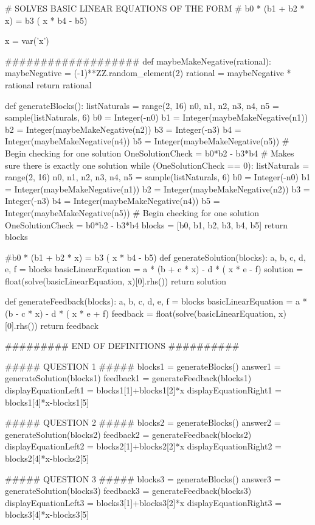 \documentclass{ximera}
\begin{document}
\begin{sagesilent}
# SOLVES BASIC LINEAR EQUATIONS OF THE FORM
    # b0 * (b1 + b2 * x) = b3 ( x * b4 - b5)

x = var('x')

###################
def maybeMakeNegative(rational):
    maybeNegative = (-1)**ZZ.random_element(2)
    rational = maybeNegative * rational
    return rational

def generateBlocks():
    listNaturals = range(2, 16)
    n0, n1, n2, n3, n4, n5 = sample(listNaturals, 6)
    b0 = Integer(-n0)
    b1 = Integer(maybeMakeNegative(n1))
    b2 = Integer(maybeMakeNegative(n2))
    b3 = Integer(-n3)
    b4 = Integer(maybeMakeNegative(n4))
    b5 = Integer(maybeMakeNegative(n5))
    # Begin checking for one solution
    OneSolutionCheck = b0*b2 - b3*b4
    # Makes sure there is exactly one solution
    while (OneSolutionCheck == 0):
        listNaturals = range(2, 16)
        n0, n1, n2, n3, n4, n5 = sample(listNaturals, 6)
        b0 = Integer(-n0)
        b1 = Integer(maybeMakeNegative(n1))
        b2 = Integer(maybeMakeNegative(n2))
        b3 = Integer(-n3)
        b4 = Integer(maybeMakeNegative(n4))
        b5 = Integer(maybeMakeNegative(n5))
        # Begin checking for one solution
        OneSolutionCheck = b0*b2 - b3*b4
    blocks = [b0, b1, b2, b3, b4, b5]
    return blocks

#b0 * (b1 + b2 * x) =  b3 ( x * b4 - b5)
def generateSolution(blocks):
    a, b, c, d, e, f = blocks
    basicLinearEquation = a * (b + c * x) - d * ( x * e - f)
    solution = float(solve(basicLinearEquation, x)[0].rhs())
    return solution
    
def generateFeedback(blocks):
    a, b, c, d, e, f = blocks
    basicLinearEquation = a * (b - c * x) - d * ( x * e + f)
    feedback = float(solve(basicLinearEquation, x)[0].rhs())
    return feedback

######### END OF DEFINITIONS ##########

##### QUESTION 1 #####
blocks1 = generateBlocks()
answer1 = generateSolution(blocks1)
feedback1 = generateFeedback(blocks1)
displayEquationLeft1 = blocks1[1]+blocks1[2]*x
displayEquationRight1 = blocks1[4]*x-blocks1[5]

##### QUESTION 2 #####
blocks2 = generateBlocks()
answer2 = generateSolution(blocks2)
feedback2 = generateFeedback(blocks2)
displayEquationLeft2 = blocks2[1]+blocks2[2]*x
displayEquationRight2 = blocks2[4]*x-blocks2[5]

##### QUESTION 3 #####
blocks3 = generateBlocks()
answer3 = generateSolution(blocks3)
feedback3 = generateFeedback(blocks3)
displayEquationLeft3 = blocks3[1]+blocks3[2]*x
displayEquationRight3 = blocks3[4]*x-blocks3[5]

\end{sagesilent}
\end{document}

